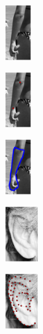 \begin{figure}[t!]
    \centering
    \begin{subfigure}[b]{0.065\textwidth}
            \includegraphics[height=2.55cm]{resources/Fig_Intro/intro_2_0}
    \end{subfigure}
    \hfill
    \begin{subfigure}[b]{0.065\textwidth}
            \includegraphics[height=2.55cm]{resources/Fig_Intro/intro_2_1}
    \end{subfigure}
    \hfill
    \begin{subfigure}[b]{0.065\textwidth}
            \includegraphics[height=2.55cm]{resources/Fig_Intro/intro_2_2}
    \end{subfigure}
    \hfill
    \begin{subfigure}[b]{0.085\textwidth}
            \includegraphics[height=2.55cm]{resources/Fig_Intro/intro_1_0}
    \end{subfigure}
    \hfill
    \begin{subfigure}[b]{0.085\textwidth}
            \includegraphics[height=2.55cm]{resources/Fig_Intro/intro_1_1}

\end{subfigure}
\end{figure}
